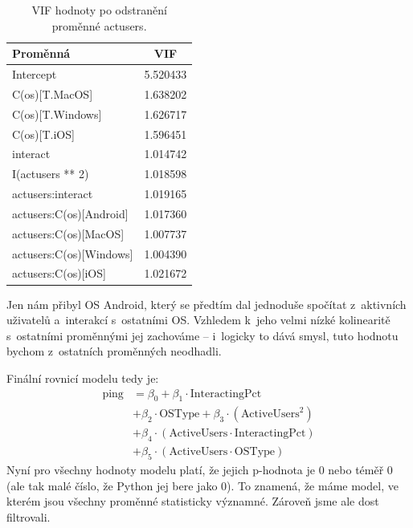 \documentclass[a4paper, 11pt]{article}
\renewcommand{\texttt}[1]{{\footnotesize\ttfamily #1}}
\begin{document}
\begin{table}
    \centering
    \begin{tabularx}{0.4\textwidth}{lC}
        \toprule
        \textbf{Proměnná} & \textbf{VIF} \\
        \midrule
        Intercept                & 5.520433 \\
        C(os)[T.MacOS]           & 1.638202 \\
        C(os)[T.Windows]         & 1.626717 \\
        C(os)[T.iOS]             & 1.596451 \\
        interact                 & 1.014742 \\
        I(actusers ** 2)         & 1.018598 \\
        actusers:interact        & 1.019165 \\
        actusers:C(os)[Android]  & 1.017360 \\
        actusers:C(os)[MacOS]    & 1.007737 \\
        actusers:C(os)[Windows]  & 1.004390 \\
        actusers:C(os)[iOS]      & 1.021672 \\
        \bottomrule
    \end{tabularx}
    \caption{VIF hodnoty po odstranění proměnné \texttt{actusers}.}
    \label{tab:vif_2}
    \vspace{-3.3em}
\end{table}

Jen nám přibyl OS Android, který se předtím dal jednoduše spočítat z~aktivních uživatelů a~interakcí s~ostatními OS.
Vzhledem k~jeho velmi nízké kolinearitě s~ostatními proměnnými jej zachováme -- i~logicky to dává smysl, tuto hodnotu bychom z~ostatních proměnných neodhadli.

Finální rovnicí modelu tedy je:
\begin{align*}
    \text{ping} &=\beta_0 + \beta_1 \cdot \text{InteractingPct} \\
    &+ \beta_2 \cdot \text{OSType} + \beta_3 \cdot (\text{ActiveUsers}^2) \\
    &+ \beta_4 \cdot (\text{ActiveUsers} \cdot \text{InteractingPct}) \\
    &+ \beta_5 \cdot (\text{ActiveUsers} \cdot \text{OSType})
\end{align*}
Nyní pro všechny hodnoty modelu platí, že jejich p-hodnota je 0 nebo téměř 0 (ale tak malé číslo, že Python jej bere jako 0).
To znamená, že máme model, ve kterém jsou všechny proměnné statisticky významné.
Zároveň jsme ale dost filtrovali.
\end{document}
